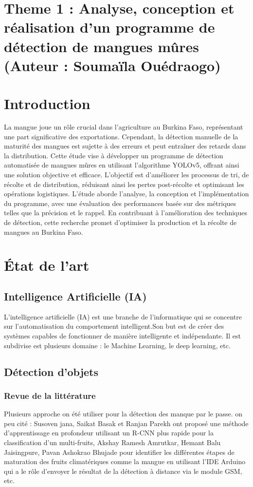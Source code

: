 \documentclass{article}
\begin{document}
	\section{Theme 1 : Analyse, conception et réalisation d’un programme
		de détection de mangues mûres (Auteur : Soumaïla Ouédraogo)}
	
	\section{Introduction}
	La mangue joue un rôle crucial dans l'agriculture au Burkina Faso, représentant une part significative des exportations. Cependant, la détection manuelle de la maturité des mangues est sujette à des erreurs et peut entraîner des retards dans la distribution. Cette étude vise à développer un programme de détection automatisée de mangues mûres en utilisant l'algorithme YOLOv5, offrant ainsi une solution objective et efficace. L'objectif est d'améliorer les processus de tri, de récolte et de distribution, réduisant ainsi les pertes post-récolte et optimisant les opérations logistiques. L'étude aborde l'analyse, la conception et l'implémentation du programme, avec une évaluation des performances basée sur des métriques telles que la précision et le rappel. En contribuant à l'amélioration des techniques de détection, cette recherche promet d'optimiser la production et la récolte de mangues au Burkina Faso.
	
	
	\section{État de l'art}
	
	\subsection{Intelligence Artificielle (IA)}
	L’intelligence artificielle (IA) est une branche de l’informatique qui se concentre sur l’automatisation
	du comportement intelligent.Son but est de créer des systèmes capables de fonctionner de manière
	intelligente et indépendante. Il est subdivise est plusieurs domaine : le Machine Learning, le deep learning, etc.
	
	\subsection{Détection d'objets}
	\subsubsection{Revue de la littérature}
	Plusieurs approche on été utiliser pour la détection des manque par le passe. on peu cité : Susoven jana, Saikat Basak et Ranjan Parekh ont proposé une méthode d’apprentissage
	en profondeur utilisant un R-CNN plus rapide pour la classification d’un multi-fruits, Akshay Ramesh Amrutkar, Hemant Balu Jaisingpure,
	Pavan Ashokrao Bhujade pour identifier les différentes étapes de maturation des fruits climatériques
	comme la mangue en utilisant l’IDE Arduino qui a le rôle d’envoyer le résultat de la détection à
	distance via le module GSM, etc.
	
\end{document}
